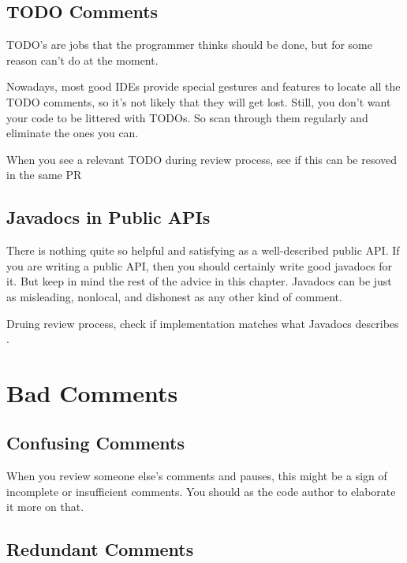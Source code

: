 \subsection{TODO Comments}

TODO's are jobs that the programmer thinks should be done, but for some reason
can't do at the moment.

Nowadays, most good IDEs provide special gestures and features to locate all the
TODO comments, so it's not likely that they will get lost. Still, you don't want your code to be littered with TODOs. So scan through them regularly and eliminate the ones you can.

\begin{marker}
When you see a relevant TODO during review process, see if this can be resoved in the same PR
\end{marker}

\subsection{Javadocs in Public APIs}

There is nothing quite so helpful and satisfying as a well-described public API. If you are writing a public API, then you should certainly write good javadocs for it. But keep in mind the rest of the advice in this chapter. Javadocs can be just as misleading, nonlocal, and dishonest as any other kind of comment.

\begin{marker}
Druing review process, check if implementation matches what Javadocs describes .
\end{marker}

\section{Bad Comments}

\subsection{Confusing Comments}

When you review someone else's comments and pauses, this might be a sign of incomplete or insufficient comments. You should as the code author to elaborate it more on that.

\subsection{Redundant Comments}

